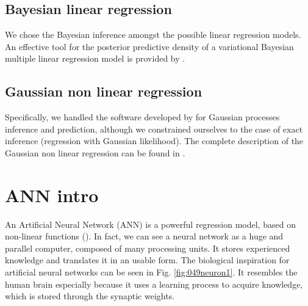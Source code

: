 \subsection{Bayesian linear regression}
\label{subsec:bayesianlinearregression}

We chose the Bayesian inference amongst the possible linear regression models.
An effective tool for the posterior predictive density of a variational Bayesian
multiple linear regression model is provided by \citet{RefWorks:193}.

\subsection{Gaussian non linear regression}
\label{subsec:gaussiannonlinearregression}

Specifically, we handled the software developed by \citet{RefWorks:192} 
for Gaussian processes inference and prediction, although we constrained ourselves to the case of exact inference
(regression with Gaussian likelihood).
The complete description of the Gaussian non linear regression can be found in
\citet{RefWorks:194}.




\section{ANN intro}
\label{sec:annintro}
An Artificial Neural Network (\acs{ANN}) is a powerful regression model, 
based on non-linear functions (\citet{RefWorks:158}). 
In fact, we can see a neural network as a huge and parallel computer, composed
of many processing units. It stores experienced knowledge and translates it in
an usable form. 
The biological inspiration for artificial neural networks can be seen in Fig.
\ref{fig:049neuron1}. It resembles the human brain especially because it
uses a learning process to acquire knowledge, which is stored through the
synaptic weights.

